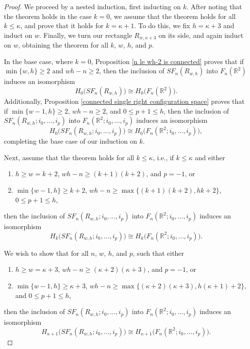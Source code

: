 \documentclass[pagebackref,colorlinks,citecolor=blue,linkcolor=blue,urlcolor=blue,filecolor=blue]{article}
\theoremstyle{definition}\newtheorem{definition}[thm]{Definition}
\theoremstyle{definition}
\newcommand{\R}{\ensuremath{\mathbb{R}}}
\begin{document}
\begin{proof}
We proceed by a nested induction, first inducting on $k$.
After noting that the theorem holds in the case $k=0$, we assume that the theorem holds for all $k\le \kappa$, and prove that it holds for $k=\kappa+1$.
To do this, we fix $h=\kappa+3$ and induct on $w$.
Finally, we turn our rectangle $R_{w,\kappa+3}$ on its side, and again induct on $w$, obtaining the theorem for all $k$, $w$, $h$, and $p$.

In the base case, where $k=0$, Proposition \ref{n le wh-2 is connected} proves that if $\min\{w,h\}\ge 2$ and $wh-n\ge 2$, then the inclusion of $SF_{n}(R_{w,h})$ into $F_{n}(\R^{2})$ induces an isomorphism
\[
H_{0}\big(SF_{n}(R_{w,h})\big)\cong H_{0}\big(F_{n}(\R^{2})\big).
\]
Additionally, Proposition  \ref{connected single right configuration space} proves that if $\min\{w-1,h\}\ge 2$, $wh-n\ge 2$, and $0\le p+1\le h$, then the inclusion of $SF_{n}(R_{w,h}; i_{0}, \dots, i_{p})$ into $F_{n}(\R^{2}; i_{0}, \dots, i_{p})$ induces an isomorphism
\[
H_{0}\big(SF_{n}(R_{w,h}; i_{0}, \dots, i_{p})\big)\cong H_{0}\big(F_{n}(\R^{2}; i_{0}, \dots, i_{p})\big),
\]
completing the base case of our induction on $k$.

Next, assume that the theorem holds for all $k\le \kappa$, i.e., if $k\le \kappa$ and either 
\begin{enumerate}
    \item $h\ge w=k+2$, $wh-n\ge (k+1)(k+2)$, and $p=-1$, or
    \item $\min\{w-1,h\}\ge k+2$, $wh-n\ge \max\big\{(k+1)(k+2), hk+2\big\}$, $0\le p+1\le h$,
\end{enumerate}
then the inclusion of $SF_{n}(R_{w,h};i_{0}, \dots, i_{p})$ into $F_{n}(\R^{2};i_{0}, \dots, i_{p})$ induces an isomorphism
\[
H_{k}\big(SF_{n}(R_{w,h};i_{0}, \dots, i_{p})\big)\cong H_{k}\big(F_{n}(\R^{2};i_{0}, \dots, i_{p})\big).
\]

We wish to show that for all $n$, $w$, $h$, and $p$, such that either
\begin{enumerate}
\item $h\ge w=\kappa+3$, $wh-n\ge (\kappa+2)(\kappa+3)$, and $p=-1$, or
\item $\min\{w-1,h\}\ge \kappa+3$, $wh-n\ge \max\big\{(\kappa+2)(\kappa+3), h(\kappa+1)+2\big\}$, and $0\le p+1\le h$, 
\end{enumerate}
then the inclusion of $SF_{n}(R_{w,h};i_{0}, \dots, i_{p})$ into $F_{n}(\R^{2};i_{0}, \dots, i_{p})$ induces an isomorphism
\[
    H_{\kappa+1}\big(SF_{n}(R_{w,h};i_{0}, \dots, i_{p})\big)\cong H_{\kappa+1}\big(F_{n}(\R^{2};i_{0}, \dots, i_{p})\big).
\]


\end{proof}
\end{document}
